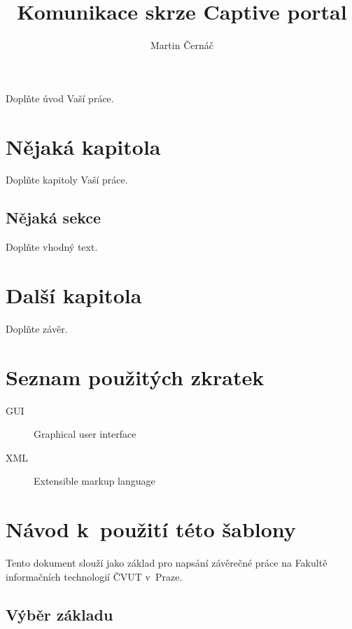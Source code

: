 \documentclass[thesis=M,czech]{FITthesis}[2012/10/20]
\title{Komunikace skrze Captive portal}
\author{Martin Černáč} %
\begin{document}
\begin{introduction}
	Doplňte úvod Vaší práce.
\end{introduction}

\chapter{Nějaká kapitola}

Doplňte kapitoly Vaší práce.

\section{Nějaká sekce}

Doplňte vhodný text.

\chapter{Další kapitola}


\begin{conclusion}
	Doplňte závěr.
	
\end{conclusion}




\appendix

\chapter{Seznam použitých zkratek}
\begin{description}
	\item[GUI] Graphical user interface
	\item[XML] Extensible markup language
\end{description}



\chapter{Návod k~použití této šablony}

Tento dokument slouží jako základ pro napsání závěrečné práce na Fakultě informačních technologií ČVUT v~Praze.

\section{Výběr základu}
\end{document}
